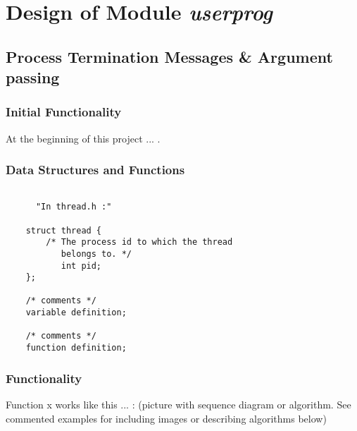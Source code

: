 
\chapter{Design of Module \textit{userprog}}


\section{Process Termination Messages \& Argument passing}

    \subsection{Initial Functionality}

	At the beginning of this project ... .

    \subsection{Data Structures and Functions}

    \begin{lstlisting}

      "In thread.h :"
	
	struct thread {
	    /* The process id to which the thread
	       belongs to. */
	       int pid;
	};

	/* comments */
	variable definition;

	/* comments */
	function definition;

    \end{lstlisting}


    \subsection{Functionality}

	Function x works like this ... : (picture with sequence diagram or algorithm. See commented examples for including images or describing algorithms below)




